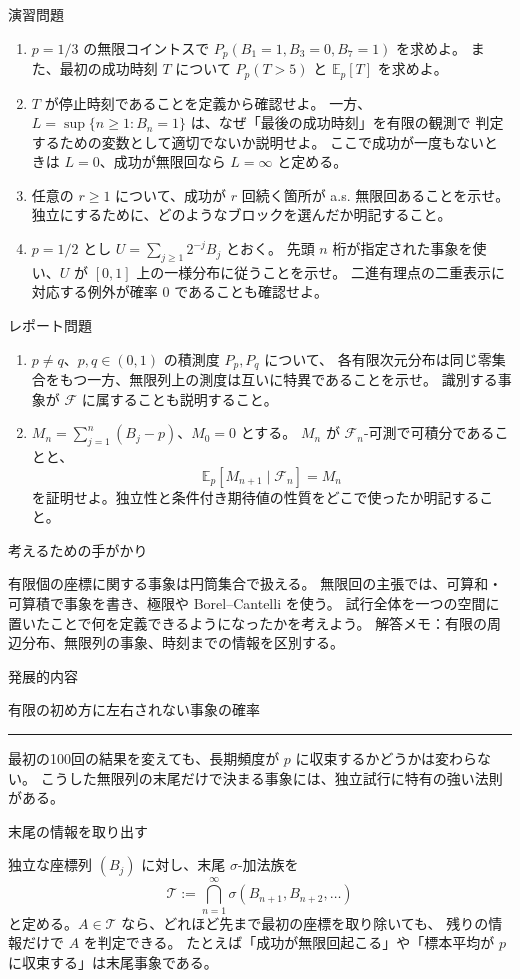 \documentclass[a4paper,10pt,pdflatex,ja=standard,jafont=ipaex-type1,
  magstyle=real,scale=1]{bxjsarticle}
\newcommand{\coursename}{確率論と統計学 I}
\newcommand{\topic}[1]{\par\vspace{5pt}
  {\large\sffamily\mdseries\color{accent}#1}\par\vspace{2pt}}
\newcommand{\columnheading}[1]{\par\vspace{5pt}
  {\fontsize{11pt}{15pt}\selectfont\sffamily\mdseries\color{accent}#1}\par\vspace{2pt}}
\newcommand{\columnstart}[1]{\clearpage
  \setlength{\parskip}{2.5pt}
  \fancyhead[L]{\small\color{ink}\coursename{}・発展的内容}
  {\small\sffamily\mdseries\color{accent}発展的内容}\par\vspace{4pt}
  {\Large\color{ink}#1}\par\vspace{2pt}
  {\color{accent}\rule{\linewidth}{0.7pt}}\par\vspace{4pt}}
\newcommand{\F}{\mathcal F}
\newcommand{\E}{\mathbb E}
\begin{document}
\newpage
\topic{演習問題}
\begin{enumerate}[label=\arabic*.]
\item $p=1/3$ の無限コイントスで $P_p(B_1=1,B_3=0,B_7=1)$ を求めよ。
また、最初の成功時刻 $T$ について $P_p(T>5)$ と $\E_p[T]$ を求めよ。
\item $T$ が停止時刻であることを定義から確認せよ。
一方、$L=\sup\{n\ge1:B_n=1\}$ は、なぜ「最後の成功時刻」を有限の観測で
判定するための変数として適切でないか説明せよ。
ここで成功が一度もないときは $L=0$、成功が無限回なら $L=\infty$ と定める。
\item 任意の $r\ge1$ について、成功が $r$ 回続く箇所が a.s. 無限回あることを示せ。
独立にするために、どのようなブロックを選んだか明記すること。
\item $p=1/2$ とし $U=\sum_{j\ge1}2^{-j}B_j$ とおく。
先頭 $n$ 桁が指定された事象を使い、$U$ が $[0,1]$ 上の一様分布に従うことを示せ。
二進有理点の二重表示に対応する例外が確率 $0$ であることも確認せよ。
\end{enumerate}

\topic{レポート問題}
\begin{enumerate}[label=\arabic*.]
\item $p\ne q$、$p,q\in(0,1)$ の積測度 $P_p,P_q$ について、
各有限次元分布は同じ零集合をもつ一方、無限列上の測度は互いに特異であることを示せ。
識別する事象が $\F$ に属することも説明すること。
\item $M_n=\sum_{j=1}^n(B_j-p)$、$M_0=0$ とする。
$M_n$ が $\F_n$-可測で可積分であることと、
$$\E_p[M_{n+1}\mid\F_n]=M_n$$
を証明せよ。独立性と条件付き期待値の性質をどこで使ったか明記すること。
\end{enumerate}

\topic{考えるための手がかり}
有限個の座標に関する事象は円筒集合で扱える。
無限回の主張では、可算和・可算積で事象を書き、極限や Borel--Cantelli を使う。
試行全体を一つの空間に置いたことで何を定義できるようになったかを考えよう。
\vfill
{\small\color{muted}解答メモ：有限の周辺分布、無限列の事象、時刻までの情報を区別する。}

\columnstart{有限の初め方に左右されない事象の確率}
最初の100回の結果を変えても、長期頻度が $p$ に収束するかどうかは変わらない。
こうした無限列の末尾だけで決まる事象には、独立試行に特有の強い法則がある。

\columnheading{末尾の情報を取り出す}
独立な座標列 $(B_j)$ に対し、末尾 $\sigma$-加法族を
$$\mathcal T:=\bigcap_{n=1}^\infty\sigma(B_{n+1},B_{n+2},\ldots)$$
と定める。$A\in\mathcal T$ なら、どれほど先まで最初の座標を取り除いても、
残りの情報だけで $A$ を判定できる。
たとえば「成功が無限回起こる」や「標本平均が $p$ に収束する」は末尾事象である。
\end{document}
